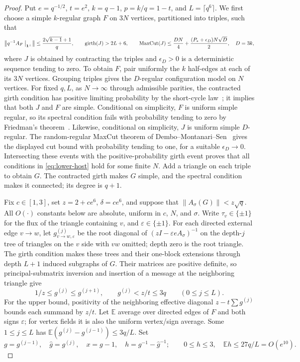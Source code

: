 \documentclass[10pt]{article}
\numberwithin{equation}{section}
\newcommand{\1}{\mathbf1}
\begin{document}
\begin{proof}
Put $e=q^{-1/2}$, $t=e^2$, $k=q-1$, $p=k/q=1-t$, and
$L=\lceil q^6\rceil$. We first choose a simple $k$-regular graph $F$
on $3N$ vertices, partitioned into triples, such that
\begin{equation}\label{eq:lower-host}
 \left\|q^{-1}A_F\bigm|_{\mathbf1^\perp}\right\|
 \le\frac{2\sqrt{k-1}+1}{q},\qquad
 \operatorname{girth}(J)>2L+6,\qquad
 \operatorname{MaxCut}(J)\le\frac{DN}{4}
       +\frac{(P_*+\epsilon_D)N\sqrt D}{2},\quad D=3k,
\end{equation}
where $J$ is obtained by contracting the triples and
$\epsilon_D>0$ is a deterministic sequence tending to zero.
To obtain $F$, pair uniformly the $k$ half-edges at each of its
$3N$ vertices. Grouping triples gives the $D$-regular configuration
model on $N$ vertices. For fixed $q,L$, as $N\to\infty$ through
admissible parities, the contracted girth condition has positive
limiting probability by the short-cycle law~\cite{MWW}; it implies
that both $J$ and $F$ are simple. Conditional on simplicity, $F$
is uniform simple regular, so its spectral condition fails with
probability tending to zero by Friedman's theorem~\cite{Bordenave}.
Likewise, conditional on simplicity, $J$ is uniform simple
$D$-regular. The random-regular MaxCut theorem of
Dembo--Montanari--Sen~\cite[Theorem 1.6(b)]{DMS} gives the displayed
cut bound with probability tending to one, for a suitable
$\epsilon_D\to0$. Intersecting these events with the positive-probability
girth event proves that all conditions in \eqref{eq:lower-host}
hold for some finite $N$.
Add a triangle on each triple to obtain $G$. The contracted girth
makes $G$ simple, and the spectral condition makes it connected;
its degree is $q+1$.

Fix $c\in[1,3]$, set $z=2+ce^6$, $\delta=ce^6$, and suppose that
$\|A_\sigma(G)\|<z\sqrt q$. All $O(\cdot)$ constants below are absolute,
uniform in $c$, $N$, and $\sigma$. Write $\tau_v\in\{\pm1\}$ for the
flux of the triangle containing $v$, and $\varepsilon\in\{\pm1\}$.
For each directed external edge $v\to w$, let
$g^{(j)}_{v\to w,\varepsilon}$ be the root diagonal of
$(zI-\varepsilon eA_\sigma)^{-1}$ on the depth-$j$ tree of triangles
on the $v$ side with $vw$ omitted; depth zero is the root triangle.
The girth condition makes these trees and their one-block extensions
through depth $L+1$ induced subgraphs of $G$. Their matrices are
positive definite, so principal-submatrix inversion and insertion
of a message at the neighboring triangle give
\[
 1/z\le g^{(j)}\le g^{(j+1)},\qquad g^{(j)}<z/t\le3q
 \qquad(0\le j\le L).
\]
For the upper bound, positivity of the neighboring effective diagonal
$z-t\sum g^{(j)}$ bounds each summand by $z/t$.
Let $\mathbb E$ average over directed edges of $F$ and both signs
$\varepsilon$; for vertex fields it is also the uniform vertex/sign
average. Some $1\le j\le L$ has
$\mathbb E(g^{(j)}-g^{(j-1)})\le3q/L$. Set
\begin{equation}\label{eq:lower-defect}
 g=g^{(j-1)},\quad \widehat g=g^{(j)},\quad x=g-1,\quad
 h=g^{-1}-\widehat g^{-1};
 \qquad 0\le h\le3,\quad\mathbb Eh\le27q/L=O(e^{10}).
\end{equation}


\end{proof}
\end{document}
